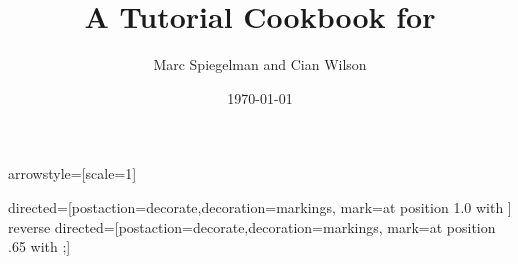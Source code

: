 \usetikzlibrary{fit, positioning, trees}
\usetikzlibrary{decorations.markings}
\usetikzlibrary{arrows,shapes}
\tikzstyle arrowstyle=[scale=1]
\newcommand{\tikzmark}[2]{\tikz[overlay,remember picture,baseline=(#1.base)] \node (#1) {#2};}
%
\newcommand{\tikzhighlight}[4]{%
    \tikz[overlay,remember picture]{
    \node[highlight,fill=#4,fit=(#2.north west) (#3.south east)] (#1) {};}
}

\newcommand{\tikztermhighlight}[3]{\tikz[baseline=(#2.base)] \node[onslide=<#1>{highlightred}] (#2) {#3};}
\newcommand{\tikztermhighlightgreen}[3]{\tikz[baseline=(#2.base)] \node[onslide=<#1>{highlightgreen}] (#2) {#3};}


\tikzstyle directed=[postaction={decorate,decoration={markings,
    mark=at position 1.0 with {}}}]
\tikzstyle reverse directed=[postaction={decorate,decoration={markings,
    mark=at position .65 with
    {;}}}]
\usepackage{macros}
\addtolength{\textwidth}{2cm}
\addtolength{\foremargin}{-2cm}
\checkandfixthelayout




\makeatletter
\def\maketitle{%
  \null
  \thispagestyle{empty}%
  \vfill
  \begin{center}\leavevmode
    \normalfont
    {\LARGE\raggedleft \@author\par}%
    \hrulefill\par
    {\huge\raggedright \@title\par}%
    \vfill
    {\Large \@date\par}%
  \end{center}%
  \null
  \cleardoublepage
  }
\makeatother
\author{Marc Spiegelman and Cian Wilson}
\title{A Tutorial Cookbook for \TF{}}
\date{\today}


\pagestyle{ruled} %


\setcounter{tocdepth}{2}

\renewcommand{\sc}{}





